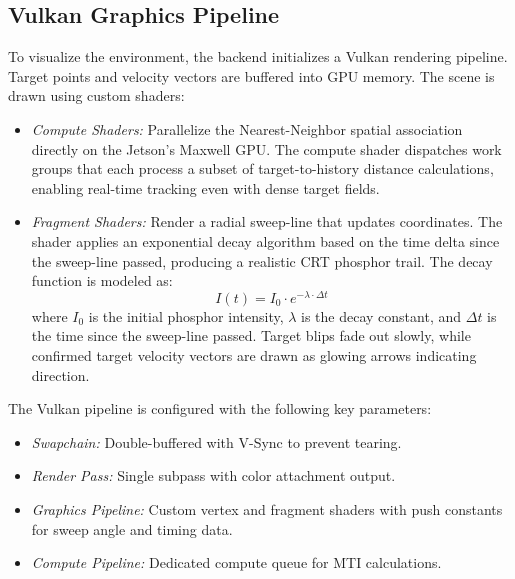 \documentclass[conference]{IEEEtran}
\begin{document}
\subsection{Vulkan Graphics Pipeline}
\label{subsec:vulkan}
To visualize the environment, the backend initializes a Vulkan rendering pipeline. Target points and velocity vectors are buffered into GPU memory. The scene is drawn using custom shaders:
\begin{itemize}
    \item \textit{Compute Shaders:} Parallelize the Nearest-Neighbor spatial association directly on the Jetson's Maxwell GPU. The compute shader dispatches work groups that each process a subset of target-to-history distance calculations, enabling real-time tracking even with dense target fields.
    \item \textit{Fragment Shaders:} Render a radial sweep-line that updates coordinates. The shader applies an exponential decay algorithm based on the time delta since the sweep-line passed, producing a realistic CRT phosphor trail. The decay function is modeled as:
    \begin{equation}
        I(t) = I_0 \cdot e^{-\lambda \cdot \Delta t}
        \label{eq:crt_decay}
    \end{equation}
    where $I_0$ is the initial phosphor intensity, $\lambda$ is the decay constant, and $\Delta t$ is the time since the sweep-line passed. Target blips fade out slowly, while confirmed target velocity vectors are drawn as glowing arrows indicating direction.
\end{itemize}

The Vulkan pipeline is configured with the following key parameters:
\begin{itemize}
    \item \textit{Swapchain:} Double-buffered with V-Sync to prevent tearing.
    \item \textit{Render Pass:} Single subpass with color attachment output.
    \item \textit{Graphics Pipeline:} Custom vertex and fragment shaders with push constants for sweep angle and timing data.
    \item \textit{Compute Pipeline:} Dedicated compute queue for MTI calculations.
\end{itemize}
\end{document}

